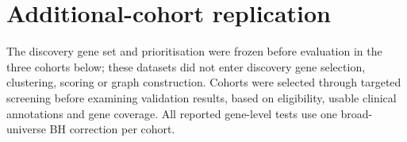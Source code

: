 \documentclass[10pt,a4paper]{article}
\begin{document}


\clearpage
\section*{Additional-cohort replication}
The discovery gene set and prioritisation were frozen before evaluation in the three cohorts below; these datasets did not enter discovery gene selection, clustering, scoring or graph construction. Cohorts were selected through targeted screening before examining validation results, based on eligibility, usable clinical annotations and gene coverage. All reported gene-level tests use one broad-universe BH correction per cohort.
\end{document}
